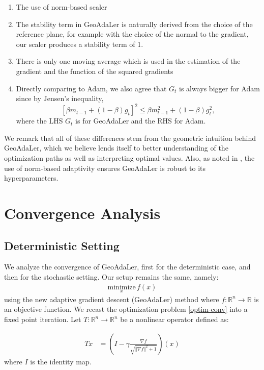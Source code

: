 \documentclass{article}
\begin{document}
\begin{enumerate}[label=(\alph*)]
    \item The use of norm-based scaler
    \item The stability term in GeoAdaLer is naturally derived from the choice of the reference plane, for example with the choice of the normal to the gradient, our scaler produces a stability term of 1. 
    \item There is only one moving average which is used in the estimation of the gradient and the function of the squared gradients
    \item Directly comparing to Adam, we also agree that $G_t$ is always bigger for Adam  since by Jensen's inequality,
    $$
    \left[ \beta m_{t-1} + (1-\beta) g_t \right]^2 \le \beta m_{t-1}^2 + (1-\beta) g_t^2,
    $$
    where the LHS $G_t$ is for GeoAdaLer and  the RHS for Adam.
\end{enumerate} 

\noindent
We remark that all of these differences stem from the geometric intuition behind GeoAdaLer, which we believe lends itself to better understanding of the optimization paths as well as interpreting optimal values. Also, as noted in \cite{ward2020adagrad}, the use of norm-based adaptivity ensures GeoAdaLer is robust to its hyperparameters.


\section{Convergence Analysis}
\subsection{Deterministic Setting}
We analyze the convergence of GeoAdaLer, first for the deterministic case, and then for the stochastic setting. Our setup remains the same, namely:
\begin{align}\label{optim-conv}
    \underset{x}{\text{minimize}} \, f(x)
\end{align}
using the new adaptive gradient descent (GeoAdaLer)  method where $f:\mathbb{R}^n  \to \mathbb{R}$ is an objective function. We recast the optimization problem \eqref{optim-conv} into a fixed point iteration. Let $T:\mathbb{R}^n \to \mathbb{R}^n$ be a nonlinear operator defined as:

\begin{align}\label{operator}
  Tx  &= \left( I - \gamma\frac{\nabla f}{\sqrt{\Vert \nabla f \Vert^2 + 1} } \right) (x)
\end{align}
where $I$ is the identity map.
\end{document}
